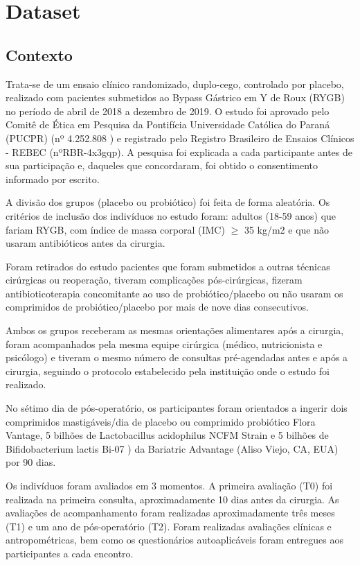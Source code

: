 \documentclass[AMA,STIX1COL]{WileyNJD-v2}
\begin{document}
\section{Dataset}\label{sec2}

\subsection{Contexto}

Trata-se de um ensaio clínico randomizado, duplo-cego, controlado por placebo, realizado com pacientes submetidos ao Bypass Gástrico em Y de Roux (RYGB) no período de abril de 2018 a dezembro de 2019. O estudo foi aprovado pelo Comitê de Ética em Pesquisa da Pontifícia Universidade Católica do Paraná (PUCPR) (nº 4.252.808 ) e registrado pelo Registro Brasileiro de Ensaios Clínicos - REBEC (nºRBR-4x3gqp). A pesquisa foi explicada a cada participante antes de sua participação e, daqueles que concordaram, foi obtido o consentimento informado por escrito.

A divisão dos grupos (placebo ou probiótico) foi feita de forma aleatória. Os critérios de inclusão dos indivíduos no estudo foram: adultos (18-59 anos) que fariam RYGB, com índice de massa corporal (IMC) $\geq$ 35 kg/m2 e que não usaram antibióticos antes da cirurgia. 

Foram retirados do estudo pacientes que foram submetidos a outras técnicas cirúrgicas ou reoperação, tiveram complicações pós-cirúrgicas, fizeram antibioticoterapia concomitante ao uso de probiótico/placebo ou não usaram os comprimidos de probiótico/placebo por mais de nove dias consecutivos. 

Ambos os grupos receberam as mesmas orientações alimentares após a cirurgia, foram acompanhados pela mesma equipe cirúrgica (médico, nutricionista e psicólogo) e tiveram o mesmo número de consultas pré-agendadas antes e após a cirurgia, seguindo o protocolo estabelecido pela instituição onde o estudo foi realizado.

No sétimo dia de pós-operatório, os participantes foram orientados a ingerir dois comprimidos mastigáveis/dia de placebo ou comprimido probiótico Flora Vantage, 5 bilhões de Lactobacillus acidophilus NCFM \textregistered Strain e 5 bilhões de Bifidobacterium lactis Bi-07 \textregistered) da Bariatric Advantage (Aliso Viejo, CA, EUA) por 90 dias.

Os indivíduos foram avaliados em 3 momentos. A primeira avaliação (T0) foi realizada na primeira consulta, aproximadamente 10 dias antes da cirurgia. As avaliações de acompanhamento foram realizadas aproximadamente três meses (T1) e um ano de pós-operatório (T2). Foram realizadas avaliações clínicas e antropométricas, bem como os questionários autoaplicáveis foram entregues aos participantes a cada encontro.
\end{document}
